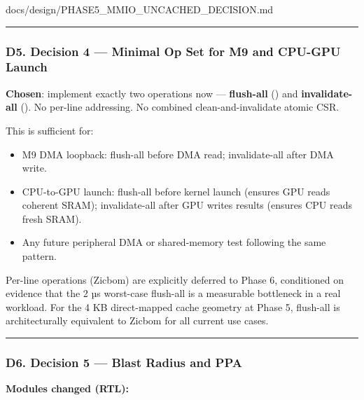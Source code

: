 \begin{relocated}{docs/design/PHASE5_MMIO_UNCACHED_DECISION.md}
\begin{center}\rule{0.5\linewidth}{0.5pt}\end{center}

\subsubsection{D5. Decision 4 --- Minimal Op Set for M9 and CPU-GPU
Launch}\label{ds:dec:phase5-mmio-uncached:d5-decision-4-minimal-op-set-for-m9-and-cpu-gpu-launch}

\textbf{Chosen}: implement exactly two operations now ---
\textbf{flush-all} () and \textbf{invalidate-all}
(). No per-line addressing. No combined
clean-and-invalidate atomic CSR.

This is sufficient for:

\begin{itemize}
\tightlist
\item
  M9 DMA loopback: flush-all before DMA read; invalidate-all after DMA
  write.
\item
  CPU-to-GPU launch: flush-all before kernel launch (ensures GPU reads
  coherent SRAM); invalidate-all after GPU writes results (ensures CPU
  reads fresh SRAM).
\item
  Any future peripheral DMA or shared-memory test following the same
  pattern.
\end{itemize}

Per-line operations (Zicbom) are explicitly deferred to Phase 6,
conditioned on evidence that the 2 µs worst-case flush-all is a
measurable bottleneck in a real workload. For the 4 KB direct-mapped
cache geometry at Phase 5, flush-all is architecturally equivalent to
Zicbom for all current use cases.

\begin{center}\rule{0.5\linewidth}{0.5pt}\end{center}

\subsubsection{D6. Decision 5 --- Blast Radius and PPA}\label{ds:dec:phase5-mmio-uncached:d6-decision-5-blast-radius-and-ppa}

\textbf{Modules changed (RTL):}

{\footnotesize\setlength{\tabcolsep}{3pt}

}
\end{relocated}
